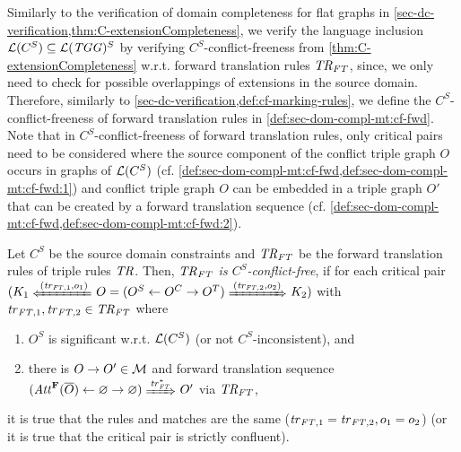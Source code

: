 Similarly to the verification of domain completeness for flat graphs in \cref{sec-dc-verification,thm:C-extensionCompleteness}, we verify the language inclusion $\mathcal{L}(C^S) \subseteq \mathcal{L}(\mathit{TGG})^S$ by verifying $C^S$-conflict-freeness from \cref{thm:C-extensionCompleteness} w.r.t. forward translation rules $\mathit{TR}_\mathit{FT}$, since, we only need to check for possible overlappings of extensions in the source domain.
Therefore, similarly to \cref{sec-dc-verification,def:cf-marking-rules}, we define the $C^S$-conflict-freeness of forward translation rules in \cref{def:sec-dom-compl-mt:cf-fwd}.
Note that in $C^S$-conflict-freeness of forward translation rules, only critical pairs need to be considered where the source component of the conflict triple graph $O$ occurs in graphs of $\mathcal{L}(C^S)$ (cf. \cref{def:sec-dom-compl-mt:cf-fwd,def:sec-dom-compl-mt:cf-fwd:1}) and conflict triple graph $O$ can be embedded in a triple graph $O'$ that can be created by a forward translation sequence (cf. \cref{def:sec-dom-compl-mt:cf-fwd,def:sec-dom-compl-mt:cf-fwd:2}).

\begin{definition}
\label{def:sec-dom-compl-mt:cf-fwd}
Let $C^S$ be the source domain constraints and $\mathit{TR}_\mathit{FT}$ be the forward translation rules of triple rules $\mathit{TR}$.
Then, \emph{$\mathit{TR}_\mathit{FT}$ is $C^S$-conflict-free}, if for each critical pair $(K_1 \TransB{(\tr_{\FT,1},o_1)}\nobreak O=(O^S \gets O^C \to O^T) \Trans{(\tr_{\FT,2},o_2)} K_2)$ with $\mathit{tr}_{\mathit{FT},1},\mathit{tr}_{\mathit{FT},2} \in \mathit{TR}_\mathit{FT}$ where 
\begin{enumerate}
  \item \label{def:sec-dom-compl-mt:cf-fwd:1}$O^S$ is significant w.r.t. $\mathcal{L}(C^S)$ (or not $C^S$-inconsistent), and
  \item \label{def:sec-dom-compl-mt:cf-fwd:2}there is $O \to O' \in {\cal M}$ and forward translation sequence $(\Att^\False(\ol{O}) \gets \varnothing \to \varnothing) \Trans{\tr_\FT^*} O'$ via $\mathit{TR}_\mathit{FT}$,
\end{enumerate}
it is true that the rules and matches are the same ($\mathit{tr}_{\mathit{FT},1}=\mathit{tr}_{\mathit{FT},2},o_1=o_2$) (or it is true that the critical pair is strictly confluent).
\envEndMarker
\end{definition}

